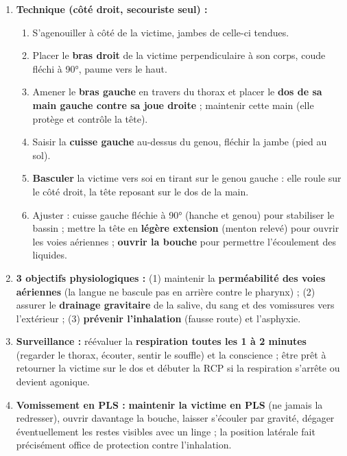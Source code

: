 \documentclass[11pt]{article}
\begin{document}
\begin{corrige}
\begin{enumerate}
    \item \textbf{Technique (côté droit, secouriste seul) :}
    \begin{enumerate}
        \item S'agenouiller à côté de la victime, jambes de celle-ci tendues.
        \item Placer le \textbf{bras droit} de la victime perpendiculaire à son corps, coude fléchi à 90°, paume vers le haut.
        \item Amener le \textbf{bras gauche} en travers du thorax et placer le \textbf{dos de sa main gauche contre sa joue droite} ; maintenir cette main (elle protège et contrôle la tête).
        \item Saisir la \textbf{cuisse gauche} au-dessus du genou, fléchir la jambe (pied au sol).
        \item \textbf{Basculer} la victime vers soi en tirant sur le genou gauche : elle roule sur le côté droit, la tête reposant sur le dos de la main.
        \item Ajuster : cuisse gauche fléchie à 90° (hanche et genou) pour stabiliser le bassin ; mettre la tête en \textbf{légère extension} (menton relevé) pour ouvrir les voies aériennes ; \textbf{ouvrir la bouche} pour permettre l'écoulement des liquides.
    \end{enumerate}
    \item \textbf{3 objectifs physiologiques :} (1) maintenir la \textbf{perméabilité des voies aériennes} (la langue ne bascule pas en arrière contre le pharynx) ; (2) assurer le \textbf{drainage gravitaire} de la salive, du sang et des vomissures vers l'extérieur ; (3) \textbf{prévenir l'inhalation} (fausse route) et l'asphyxie.
    \item \textbf{Surveillance :} réévaluer la \textbf{respiration toutes les 1 à 2 minutes} (regarder le thorax, écouter, sentir le souffle) et la conscience ; être prêt à retourner la victime sur le dos et débuter la RCP si la respiration s'arrête ou devient agonique.
    \item \textbf{Vomissement en PLS :} \textbf{maintenir la victime en PLS} (ne jamais la redresser), ouvrir davantage la bouche, laisser s'écouler par gravité, dégager éventuellement les restes visibles avec un linge ; la position latérale fait précisément office de protection contre l'inhalation.
\end{enumerate}
\end{corrige}
\end{document}
